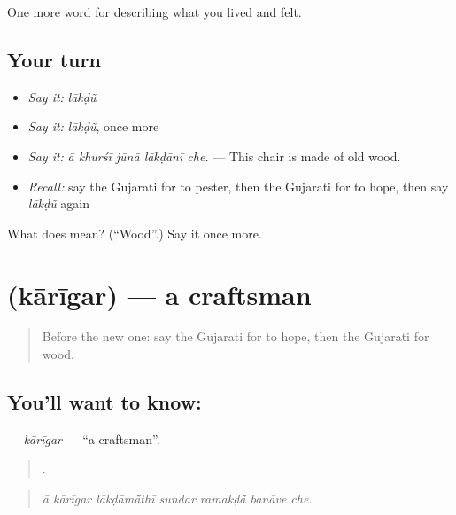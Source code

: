 \begin{grammarlens}[title={What you've built}]
One more word for describing what you lived and felt.
\end{grammarlens}

\subsection*{Your turn}
\begin{itemize}
\raggedright
  \item \emph{Say it:} \emph{lākḍũ}
  \item \emph{Say it:} \emph{lākḍũ}, once more
  \item \emph{Say it:} \emph{ā khurśī jūnā lākḍānī che.} — This chair is made of old wood.
  \item \emph{Recall:} say the Gujarati for to pester, then the Gujarati for to hope, then say \emph{lākḍũ} again
\end{itemize}

\begin{tcolorbox}[breakable,colback=teal!4,colframe=teal!35!black,title={Before you move on}]
What does  mean? (\textquotedblleft{}Wood\textquotedblright{}.) Say it once more.
\end{tcolorbox}
\section[\texorpdfstring{\gu{કારીગર} (kārīgar)}{કારીગર (kārīgar)}]{ (kārīgar) — a craftsman}

\label{lesson:GU-C501-karigar}



\begin{quote}
Before the new one: say the Gujarati for to hope, then the Gujarati for wood.
\end{quote}

\subsection*{You'll want to know: }
\textbf{} — \emph{kārīgar} — \textquotedblleft{}a craftsman\textquotedblright{}.

\begin{quote}
      .
\end{quote}

\begin{quote}
\emph{ā kārīgar lākḍāmā̃thī sundar ramakḍā̃ banāve che.}
\end{quote}

